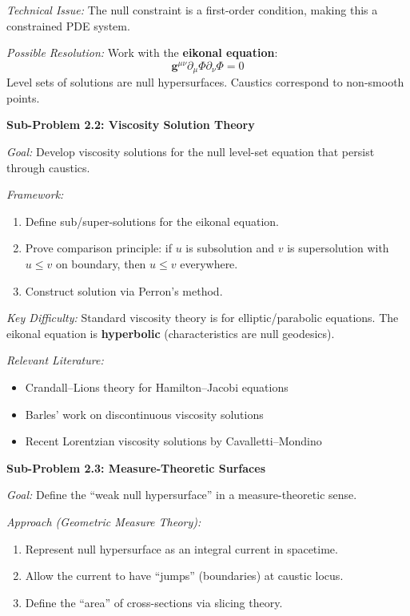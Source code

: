 \textit{Technical Issue:} The null constraint is a first-order condition, making this a constrained PDE system.

\textit{Possible Resolution:} Work with the \textbf{eikonal equation}:
\begin{equation}
    \mathbf{g}^{\mu\nu}\partial_\mu\Phi\partial_\nu\Phi = 0
\end{equation}
Level sets of solutions are null hypersurfaces. Caustics correspond to non-smooth points.

\textbf{Sub-Problem 2.2: Viscosity Solution Theory}

\textit{Goal:} Develop viscosity solutions for the null level-set equation that persist through caustics.

\textit{Framework:}
\begin{enumerate}
    \item Define sub/super-solutions for the eikonal equation.
    \item Prove comparison principle: if $u$ is subsolution and $v$ is supersolution with $u \leq v$ on boundary, then $u \leq v$ everywhere.
    \item Construct solution via Perron's method.
\end{enumerate}

\textit{Key Difficulty:} Standard viscosity theory is for elliptic/parabolic equations. The eikonal equation is \textbf{hyperbolic} (characteristics are null geodesics).

\textit{Relevant Literature:}
\begin{itemize}
    \item Crandall--Lions theory for Hamilton--Jacobi equations
    \item Barles' work on discontinuous viscosity solutions
    \item Recent Lorentzian viscosity solutions by Cavalletti--Mondino
\end{itemize}

\textbf{Sub-Problem 2.3: Measure-Theoretic Surfaces}

\textit{Goal:} Define the ``weak null hypersurface'' in a measure-theoretic sense.

\textit{Approach (Geometric Measure Theory):}
\begin{enumerate}
    \item Represent null hypersurface as an integral current in spacetime.
    \item Allow the current to have ``jumps'' (boundaries) at caustic locus.
    \item Define the ``area'' of cross-sections via slicing theory.
\end{enumerate}

